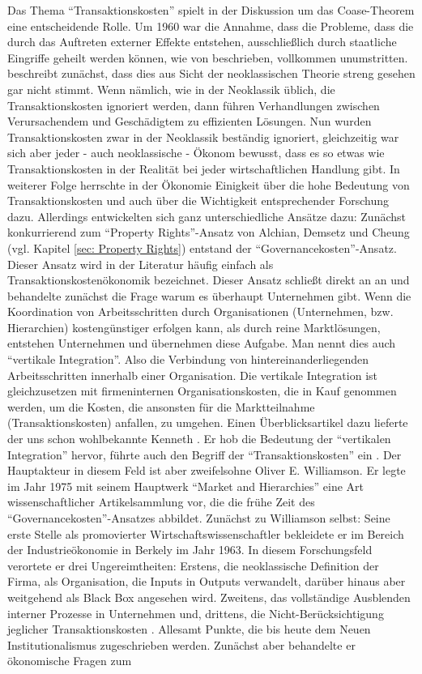 Das Thema "`Transaktionskosten"' spielt in der Diskussion um das Coase-Theorem \textcite{Coase1960} eine entscheidende Rolle. Um 1960 war die Annahme, dass die Probleme, dass die durch das Auftreten externer Effekte entstehen, ausschließlich durch staatliche Eingriffe geheilt werden können, wie von \textcite{Pigou1920} beschrieben, vollkommen unumstritten. \textcite{Coase1960} beschreibt zunächst, dass dies aus Sicht der neoklassischen Theorie streng gesehen gar nicht stimmt. Wenn nämlich, wie in der Neoklassik üblich, die Transaktionskosten ignoriert werden, dann führen Verhandlungen zwischen Verursachendem und Geschädigtem zu effizienten Lösungen. Nun wurden Transaktionskosten zwar in der Neoklassik beständig ignoriert, gleichzeitig war sich aber jeder - auch neoklassische - Ökonom bewusst, dass es so etwas wie Transaktionskosten in der Realität bei jeder wirtschaftlichen Handlung gibt. In weiterer Folge herrschte in der Ökonomie Einigkeit über die hohe Bedeutung von Transaktionskosten und auch über die Wichtigkeit entsprechender Forschung dazu. Allerdings entwickelten sich ganz unterschiedliche Ansätze dazu: Zunächst konkurrierend zum "`Property Rights"'-Ansatz von Alchian, Demsetz und Cheung (vgl. Kapitel \ref{sec: Property Rights}) entstand der "`Governancekosten"'-Ansatz. Dieser Ansatz wird in der Literatur häufig einfach als Transaktionskostenökonomik bezeichnet. Dieser Ansatz schließt direkt an \textcite{Coase1960} an und behandelte zunächst die Frage warum es überhaupt Unternehmen gibt. Wenn die Koordination von Arbeitsschritten durch Organisationen (Unternehmen, bzw. Hierarchien) kostengünstiger erfolgen kann, als durch reine Marktlösungen, entstehen Unternehmen und übernehmen diese Aufgabe. Man nennt dies auch "`vertikale Integration"'. Also die Verbindung von hintereinanderliegenden Arbeitsschritten innerhalb einer Organisation. Die vertikale Integration ist gleichzusetzen mit firmeninternen Organisationskosten, die in Kauf genommen werden, um die Kosten, die ansonsten für die Marktteilnahme (Transaktionskosten) anfallen, zu umgehen. Einen Überblicksartikel dazu lieferte der uns schon wohlbekannte Kenneth \textcite{Arrow1969}. Er hob die Bedeutung der "`vertikalen Integration"' hervor, führte auch den Begriff der "`Transaktionskosten"' ein \parencite[S. 39]{Erlei2016}. Der Hauptakteur in diesem Feld ist aber zweifelsohne Oliver E. Williamson. Er legte im Jahr 1975 mit seinem Hauptwerk "`Market and Hierarchies"' \parencite{Williamson1975} eine Art wissenschaftlicher Artikelsammlung \parencite[S. 87]{Voigt2009} vor, die die frühe Zeit des  "`Governancekosten"'-Ansatzes abbildet. Zunächst zu Williamson selbst: Seine erste Stelle als promovierter Wirtschaftswissenschaftler bekleidete er im Bereich der Industrieökonomie in Berkely im Jahr 1963. In diesem Forschungsfeld verortete er drei Ungereimtheiten: Erstens, die neoklassische Definition der Firma, als Organisation, die Inputs in Outputs verwandelt, darüber hinaus aber weitgehend als Black Box angesehen wird. Zweitens, das vollständige Ausblenden interner Prozesse in Unternehmen und, drittens, die Nicht-Berücksichtigung jeglicher Transaktionskosten \parencite{Williamson2009}. Allesamt Punkte, die bis heute dem Neuen Institutionalismus zugeschrieben werden. Zunächst aber behandelte er ökonomische Fragen zum 